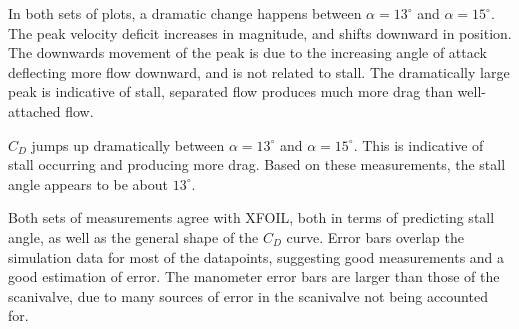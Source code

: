 \documentclass[runningheads]{llncs}
\begin{document}
\noindent
In both sets of plots, a dramatic change happens between $\alpha = 13^\circ$ and $\alpha = 15 ^\circ$. The peak velocity deficit increases in magnitude, and shifts downward in position. The downwards movement of the peak is due to the increasing angle of attack deflecting more flow downward, and is not related to stall. The dramatically large peak is indicative of stall, separated flow produces much more drag than well-attached flow.\newline

\noindent
$C_D$ jumps up dramatically between $\alpha = 13^\circ$ and $\alpha = 15 ^\circ$. This is indicative of stall occurring and producing more drag. Based on these measurements, the stall angle appears to be about $13^\circ$.\newline

\noindent
Both sets of measurements agree with XFOIL, both in terms of predicting stall angle, as well as the general shape of the $C_D$ curve. Error bars overlap the simulation data for most of the datapoints, suggesting good measurements and a good estimation of error. The manometer error bars are larger than those of the scanivalve, due to many sources of error in the scanivalve not being accounted for.\newline
\end{document}
